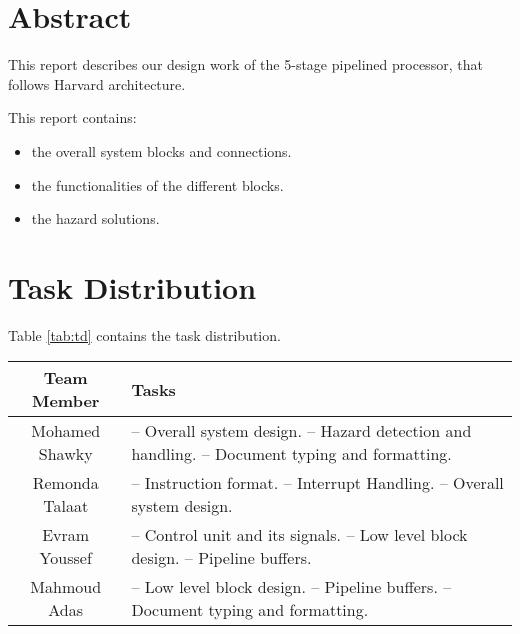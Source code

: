 \section{Abstract}
This report describes our design work of the 5-stage pipelined processor, that follows Harvard architecture.

This report contains:
\begin{itemize}
    \item the overall system blocks and connections.
    \item the functionalities of the different blocks.
    \item the hazard solutions.
\end{itemize}

\section{Task Distribution}
Table \ref{tab:td} contains the task distribution.

\begin{center}
 \begin{tabular}{||c| p{100mm}||} 
 \hline
 Team Member & Tasks \\ [0.5ex] 
 \hline\hline
 Mohamed Shawky & -- Overall system design. \newline -- Hazard detection and handling. \newline -- Document typing and formatting. \\
 \hline
 Remonda Talaat & -- Instruction format. \newline -- Interrupt Handling. \newline -- Overall system design. \\
 \hline
 Evram Youssef & -- Control unit and its signals. \newline -- Low level block design. \newline -- Pipeline buffers. \\
 \hline
 Mahmoud Adas & -- Low level block design. \newline -- Pipeline buffers. \newline -- Document typing and formatting. \\ 
 \hline
\end{tabular}
\end{center}